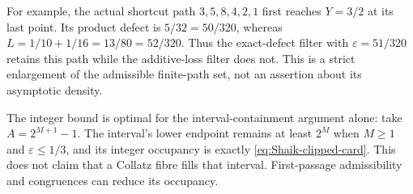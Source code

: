 For example, the actual shortcut path \(3,5,8,4,2,1\) first reaches
\(Y=3/2\) at its last point. Its product defect is \(5/32=50/320\),
whereas \(L=1/10+1/16=13/80=52/320\). Thus the exact-defect
filter with \(\varepsilon=51/320\) retains this path while the
additive-loss filter does not. This is a strict enlargement of the
admissible finite-path set, not an assertion about its asymptotic density.

The integer bound is optimal for the interval-containment argument alone:
take \(A=2^{M+1}-1\). The interval's lower endpoint remains at least
\(2^M\) when \(M\ge1\) and \(\varepsilon\le1/3\), and its integer
occupancy is exactly \eqref{eq:Shaik-clipped-card}.
This does not claim that a Collatz fibre fills that interval.
First-passage admissibility and congruences can reduce its occupancy.

